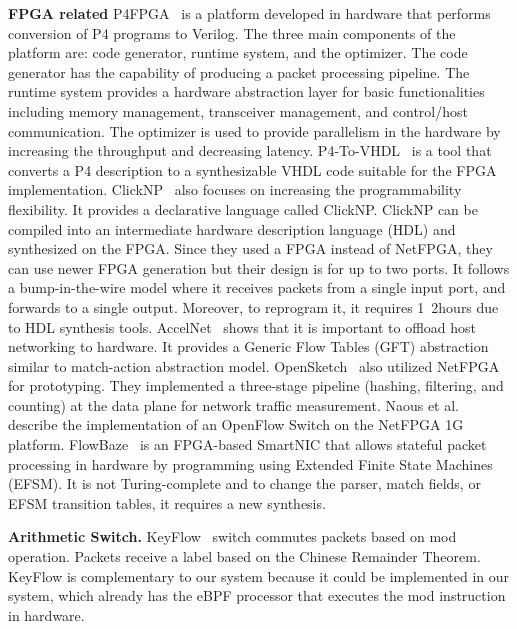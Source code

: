 \textbf{FPGA related} P4FPGA~\cite{p4fpga} is a platform developed in hardware that performs conversion of P4 programs to Verilog.
The three main components of the platform are: code generator, runtime system, and the optimizer. The code generator has the capability of producing a packet processing pipeline. The runtime system provides a hardware abstraction layer for basic functionalities including memory management, transceiver management, and control/host communication. The optimizer is used to provide parallelism in the hardware by increasing the throughput and decreasing latency.
P4-To-VHDL~\cite{BENACEK201822} is a tool that converts a P4 description to a synthesizable VHDL code suitable for the FPGA implementation.
ClickNP~\cite{ClickNP2016} also focuses on increasing the programmability flexibility.
It provides a declarative language called ClickNP.
ClickNP can be compiled into an intermediate hardware description language (HDL) and synthesized on the FPGA.
Since they used a FPGA instead of NetFPGA, they can use newer FPGA generation but their design is for up to two ports.
It follows a bump-in-the-wire model where it receives packets from a single input port, and forwards to a single output.
Moreover, to reprogram it, it requires 1~2hours due to HDL synthesis tools.
AccelNet~\cite{AzureFPGA2018} shows that it is important to
offload host networking to hardware. It provides a Generic Flow Tables (GFT) abstraction similar to match-action abstraction model.
OpenSketch~\cite{Yu:2013:SDT:2482626.2482631} also utilized NetFPGA for prototyping. They implemented a three-stage pipeline (hashing, filtering, and counting) at the data plane for network traffic measurement. Naous et al.~\cite{Naous:2008:IOS:1477942.1477944} describe the implementation of an OpenFlow Switch on the NetFPGA 1G platform. 
FlowBaze~\cite{FlowBlaze2019} is an FPGA-based SmartNIC that allows stateful packet processing in hardware by programming using Extended Finite State Machines (EFSM). It is not Turing-complete and to change the parser, match fields, or EFSM transition tables, it requires a new synthesis.

\textbf{Arithmetic Switch.} KeyFlow~\cite{Martinello2014KeyFlow}
 switch commutes packets based on mod operation.
Packets receive a label based on the Chinese Remainder Theorem.
KeyFlow is complementary to our system because it could be implemented in our system, which already has the eBPF processor that executes the mod instruction in hardware. 

